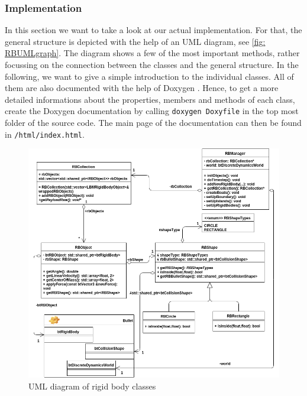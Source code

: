 \subsubsection{Implementation}
In this section we want to take a look at our actual implementation. For that, the general structure is depicted with the help of an UML diagram, see \autoref{fig: RBUMLgraph}. The diagram shows a few of the most important methods, rather focussing on the connection between the classes and the general structure. In the following, we want to give a simple introduction to the individual classes. All of them are also documented with the help of Doxygen \cite{Doxygen}. Hence, to get a more detailed informations about the properties, members and methods of each class, create the Doxygen documentation by calling \texttt{doxygen Doxyfile} in the top most folder of the source code. The main page of the documentation can then be found in \texttt{/html/index.html}.
\begin{figure}[ht]
\centering
\includegraphics[scale=0.5]{img/RigidBodies/RigidBodyUML.png}
\caption{UML diagram of rigid body classes}
\label{fig: RBUMLgraph}
\end{figure}

